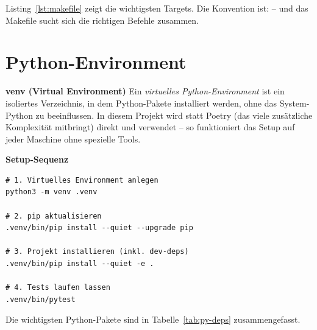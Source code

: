 Listing~\ref{lst:makefile} zeigt die wichtigsten Targets. Die
Konvention ist:  -- und das Makefile sucht
sich die richtigen Befehle zusammen.

\section{Python-Environment}

\begin{definition}
\textbf{venv (Virtual Environment)}
Ein \emph{virtuelles Python-Environment} ist ein isoliertes
Verzeichnis, in dem Python-Pakete installiert werden, ohne das
System-Python zu beeinflussen. In diesem Projekt wird statt
Poetry (das viele zusätzliche Komplexität mitbringt) direkt
 und  verwendet -- so
funktioniert das Setup auf jeder Maschine ohne spezielle Tools.
\end{definition}

\begin{beispiel}
\textbf{Setup-Sequenz}
\begin{lstlisting}[language=shell]
# 1. Virtuelles Environment anlegen
python3 -m venv .venv

# 2. pip aktualisieren
.venv/bin/pip install --quiet --upgrade pip

# 3. Projekt installieren (inkl. dev-deps)
.venv/bin/pip install --quiet -e .

# 4. Tests laufen lassen
.venv/bin/pytest
\end{lstlisting}
\end{beispiel}

Die wichtigsten Python-Pakete sind in
Tabelle~\ref{tab:py-deps} zusammengefasst.

